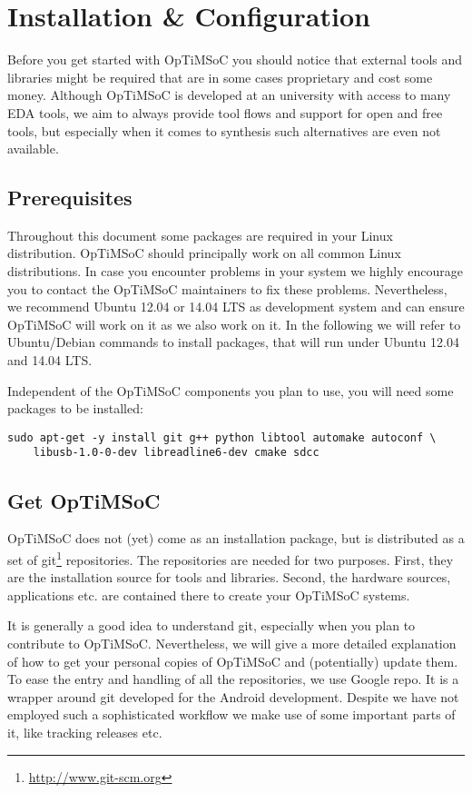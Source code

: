 \chapter{Installation \& Configuration}
\label{chap:installation}

Before you get started with OpTiMSoC you should notice that external
tools and libraries might be required that are in some cases
proprietary and cost some money. Although OpTiMSoC is developed at an
university with access to many EDA tools, we aim to always provide
tool flows and support for open and free tools, but especially when it
comes to synthesis such alternatives are even not available.

\section{Prerequisites}

Throughout this document some packages are required in your Linux
distribution. OpTiMSoC should principally work on all common Linux
distributions. In case you encounter problems in your system we highly
encourage you to contact the OpTiMSoC maintainers to fix these
problems. Nevertheless, we recommend Ubuntu 12.04 or 14.04 LTS as
development system and can ensure OpTiMSoC will work on it as we also
work on it. In the following we will refer to Ubuntu/Debian commands
to install packages, that will run under Ubuntu 12.04 and 14.04 LTS.

Independent of the OpTiMSoC components you plan to use, you will need some
packages to be installed:

\begin{lstlisting}
sudo apt-get -y install git g++ python libtool automake autoconf \
    libusb-1.0-0-dev libreadline6-dev cmake sdcc
\end{lstlisting}

\section{Get OpTiMSoC}

OpTiMSoC does not (yet) come as an installation package, but is
distributed as a set of git\footnote{\url{http://www.git-scm.org}}
repositories. The repositories are needed for two purposes. First,
they are the installation source for tools and libraries. Second, the
hardware sources, applications etc. are contained there to create your
OpTiMSoC systems.

It is generally a good idea to understand git, especially when you
plan to contribute to OpTiMSoC. Nevertheless, we will give a more
detailed explanation of how to get your personal copies of OpTiMSoC
and (potentially) update them. To ease the entry and handling of all
the repositories, we use Google repo. It is a wrapper around git
developed for the Android development. Despite we have not employed
such a sophisticated workflow we make use of some important parts of
it, like tracking releases etc.

